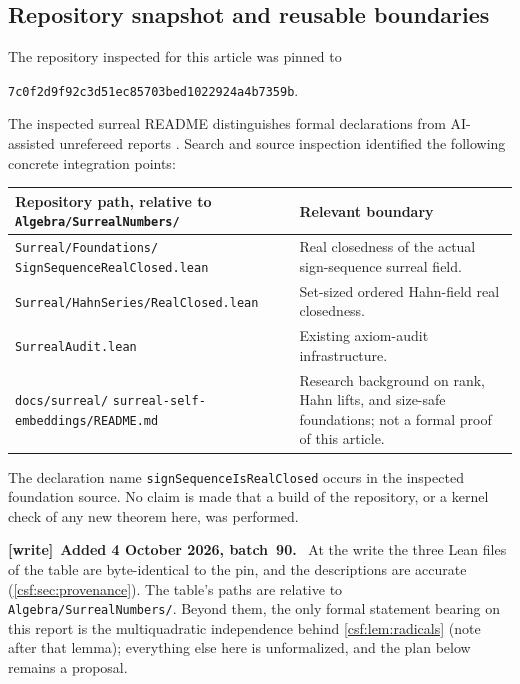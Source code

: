 \documentclass[11pt,a4paper]{article}
\numberwithin{equation}{section}
\theoremstyle{definition}
\theoremstyle{remark}
\newcommand{\repo}[1]{\nolinkurl{#1}}
\newenvironment{writenote}[1][]{\par\smallskip\begingroup\small\raggedright
 \setlength{\parindent}{1.25em}\noindent\textbf{[write]}\if\relax\detokenize{#1}\relax\else~\textbf{#1.}\fi\ }%
 {\par\endgroup\smallskip}
\begin{document}
\subsection{Repository snapshot and reusable boundaries}

The repository inspected for this article was pinned to
\begin{center}
\texttt{7c0f2d9f92c3d51ec85703bed1022924a4b7359b}.
\end{center}
The inspected surreal README distinguishes formal declarations from
AI-assisted unrefereed reports \cite{proveit}. Search and source inspection
identified the following concrete integration points:
\begin{center}
\begin{tabular}{P{0.53\textwidth}P{0.39\textwidth}}
\toprule
Repository path, relative to \texttt{Algebra/SurrealNumbers/} & Relevant boundary\\
\midrule
\texttt{Surreal/Foundations/}\newline
\texttt{SignSequenceRealClosed.lean} & Real closedness of the actual
sign-sequence surreal field.\\[4pt]
\texttt{Surreal/HahnSeries/RealClosed.lean} & Set-sized ordered Hahn-field
real closedness.\\[4pt]
\texttt{SurrealAudit.lean} & Existing axiom-audit infrastructure.\\[4pt]
\texttt{docs/surreal/}\newline
\texttt{surreal-self-embeddings/README.md} & Research background on rank,
Hahn lifts, and size-safe foundations; not a formal proof of this article.\\
\bottomrule
\end{tabular}
\end{center}
The declaration name \texttt{signSequenceIsRealClosed} occurs in the
inspected foundation source. No claim is made that a build of the
repository, or a kernel check of any new theorem here, was performed.

\begin{writenote}[Added 4 October 2026, batch~90]
At the write the three Lean files of the table are byte-identical to the pin, and the descriptions are accurate (\cref{csf:sec:provenance}). The table's paths are relative to \repo{Algebra/SurrealNumbers/}. Beyond them, the only formal statement bearing on this report is the multiquadratic independence behind \cref{csf:lem:radicals} (note after that lemma); everything else here is unformalized, and the plan below remains a proposal.
\end{writenote}
\end{document}
